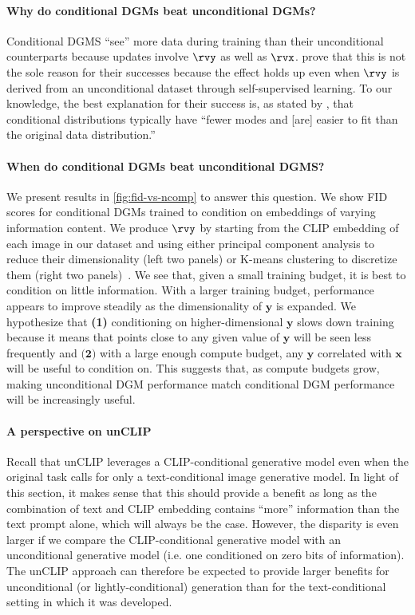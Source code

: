 \paragraph{Why do conditional DGMs beat unconditional DGMs?}

Conditional DGMS ``see'' more data during training than their unconditional counterparts because updates involve $\rvy$ as well as $\rvx$. \citet{bao2022conditional,hu2022self} prove that this is not the sole reason for their successes because the effect holds up even when $\rvy$ is derived from an unconditional dataset through self-supervised learning.
%
To our knowledge, the best explanation for their success is, as stated by \citet{bao2022conditional}, that conditional distributions typically have ``fewer modes and [are] easier to fit than the original data distribution.''

\paragraph{When do conditional DGMs beat unconditional DGMS?}
%
We present results in \cref{fig:fid-vs-ncomp} to answer this question. We show FID scores for conditional DGMs trained to condition on embeddings of varying information content. 
%
We produce $\rvy$ by starting from the CLIP embedding of each image in our dataset and using either principal component analysis to reduce their dimensionality (left two panels) or K-means clustering to discretize them (right two panels)~\citep{hu2022self}.
%
We see that, given a small training budget, it is best to condition on little information. With a larger training budget, performance appears to improve steadily as the dimensionality of $\mathbf{y}$ is expanded. We hypothesize that \textbf{(1)} conditioning on higher-dimensional $\mathbf{y}$ slows down training because it means that points close to any given value of $\mathbf{y}$ will be seen less frequently and $\textbf{(2)}$ with a large enough compute budget, any $\mathbf{y}$ correlated with $\mathbf{x}$ will be useful to condition on. This suggests that, as compute budgets grow, making unconditional DGM performance match conditional DGM performance will be increasingly useful.

\paragraph{A perspective on unCLIP}
Recall that unCLIP leverages a CLIP-conditional generative model even when the original task calls for only a text-conditional image generative model. In light of this section, it makes sense that this should provide a benefit as long as the combination of text and CLIP embedding contains ``more'' information than the text prompt alone, which will always be the case. However, the disparity is even larger if we compare the CLIP-conditional generative model with an unconditional generative model  (i.e. one conditioned on zero bits of information). The unCLIP approach can therefore be expected to provide larger benefits for unconditional (or lightly-conditional) generation than for the text-conditional setting in which it was developed.


